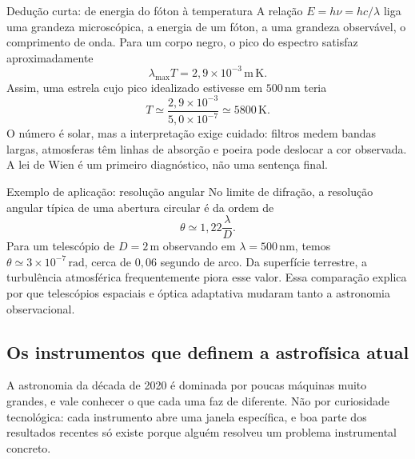\documentclass[11pt,a4paper]{article}
\begin{document}
\begin{lessonblock}[borderline west={2pt}{0pt}{astroGold}]{Dedução curta: de energia do fóton à temperatura}
A relação $E=h\nu=hc/\lambda$ liga uma grandeza microscópica, a energia de um fóton, a uma grandeza observável, o comprimento de onda. Para um corpo negro, o pico do espectro satisfaz aproximadamente
\[
\lambda_{\max}T=2{,}9\times10^{-3}\,\mathrm{m\,K}.
\]
Assim, uma estrela cujo pico idealizado estivesse em $500\,\mathrm{nm}$ teria
\[
T\simeq\frac{2{,}9\times10^{-3}}{5{,}0\times10^{-7}}\simeq5800\,\mathrm{K}.
\]
O número é solar, mas a interpretação exige cuidado: filtros medem bandas largas, atmosferas têm linhas de absorção e poeira pode deslocar a cor observada. A lei de Wien é um primeiro diagnóstico, não uma sentença final.
\end{lessonblock}

\begin{lessonblock}{Exemplo de aplicação: resolução angular}
No limite de difração, a resolução angular típica de uma abertura circular é da ordem de
\[
\theta\simeq1{,}22\frac{\lambda}{D}.
\]
Para um telescópio de $D=2\,\mathrm{m}$ observando em $\lambda=500\,\mathrm{nm}$, temos $\theta\simeq3\times10^{-7}\,\mathrm{rad}$, cerca de $0{,}06$ segundo de arco. Da superfície terrestre, a turbulência atmosférica frequentemente piora esse valor. Essa comparação explica por que telescópios espaciais e óptica adaptativa mudaram tanto a astronomia observacional.
\end{lessonblock}

\subsection*{Os instrumentos que definem a astrofísica atual}

A astronomia da década de 2020 é dominada por poucas máquinas muito grandes, e vale conhecer o que cada uma faz de diferente. Não por curiosidade tecnológica: cada instrumento abre uma janela específica, e boa parte dos resultados recentes só existe porque alguém resolveu um problema instrumental concreto.
\end{document}
